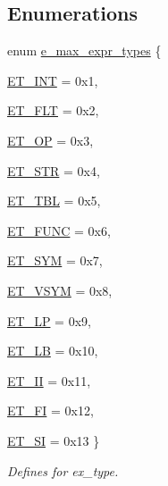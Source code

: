 \subsection*{Enumerations}
\begin{DoxyCompactItemize}
\item 
enum \hyperlink{group__expr_ga64f1e232097cbd73318392635e6bab0e}{e\_\-max\_\-expr\_\-types} \{ \par
\hyperlink{group__expr_gga64f1e232097cbd73318392635e6bab0ea099243d5b48eaf0e63699c974b587abf}{ET\_\-INT} =  0x1, 
\par
\hyperlink{group__expr_gga64f1e232097cbd73318392635e6bab0ea968ca4519aba1e3b947f8b71fd8fe623}{ET\_\-FLT} =  0x2, 
\par
\hyperlink{group__expr_gga64f1e232097cbd73318392635e6bab0ea617f0c0aa78a4df760188842fafbeda1}{ET\_\-OP} =  0x3, 
\par
\hyperlink{group__expr_gga64f1e232097cbd73318392635e6bab0eadff34cf618701594e4cd4d2d5ff439e8}{ET\_\-STR} =  0x4, 
\par
\hyperlink{group__expr_gga64f1e232097cbd73318392635e6bab0ea82f625c02be30bf2cea5c2daede0f148}{ET\_\-TBL} =  0x5, 
\par
\hyperlink{group__expr_gga64f1e232097cbd73318392635e6bab0eaf061cdcc33a494b192516b0a2bbd1451}{ET\_\-FUNC} =  0x6, 
\par
\hyperlink{group__expr_gga64f1e232097cbd73318392635e6bab0ea858df3673d71d9b70bde311f8996ac3c}{ET\_\-SYM} =  0x7, 
\par
\hyperlink{group__expr_gga64f1e232097cbd73318392635e6bab0eab7e96238528bf76765257287c0aad73a}{ET\_\-VSYM} =  0x8, 
\par
\hyperlink{group__expr_gga64f1e232097cbd73318392635e6bab0ea4358f803dd76e873c6a721a15333a8db}{ET\_\-LP} =  0x9, 
\par
\hyperlink{group__expr_gga64f1e232097cbd73318392635e6bab0ea8f8eacb969330e66d85d106aac740b26}{ET\_\-LB} =  0x10, 
\par
\hyperlink{group__expr_gga64f1e232097cbd73318392635e6bab0ea15d055742150743c638b75029b023a59}{ET\_\-II} =  0x11, 
\par
\hyperlink{group__expr_gga64f1e232097cbd73318392635e6bab0eabdaba3ee25ec2645465c06c8925bb916}{ET\_\-FI} =  0x12, 
\par
\hyperlink{group__expr_gga64f1e232097cbd73318392635e6bab0ea170485f1277407f10d0a6ca6ca8b5cc5}{ET\_\-SI} =  0x13
 \}
\begin{DoxyCompactList}\small\item\em Defines for ex\_\-type. \item\end{DoxyCompactList}\end{DoxyCompactItemize}
